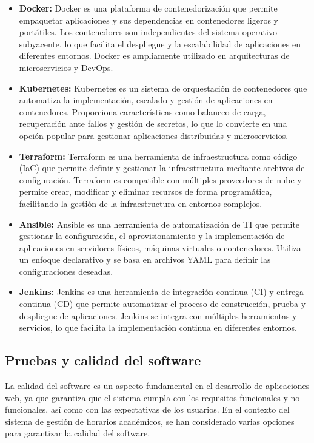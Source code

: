 \begin{itemize}
    \item \textbf{Docker:} Docker es una plataforma de contenedorización que permite empaquetar aplicaciones y sus dependencias en contenedores ligeros y portátiles. Los contenedores son independientes del sistema operativo subyacente, lo que facilita el despliegue y la escalabilidad de aplicaciones en diferentes entornos. Docker es ampliamente utilizado en arquitecturas de microservicios y DevOps.
    \item \textbf{Kubernetes:} Kubernetes es un sistema de orquestación de contenedores que automatiza la implementación, escalado y gestión de aplicaciones en contenedores. Proporciona características como balanceo de carga, recuperación ante fallos y gestión de secretos, lo que lo convierte en una opción popular para gestionar aplicaciones distribuidas y microservicios.
    \item \textbf{Terraform:} Terraform es una herramienta de infraestructura como código (IaC) que permite definir y gestionar la infraestructura mediante archivos de configuración. Terraform es compatible con múltiples proveedores de nube y permite crear, modificar y eliminar recursos de forma programática, facilitando la gestión de la infraestructura en entornos complejos.
    \item \textbf{Ansible:} Ansible es una herramienta de automatización de TI que permite gestionar la configuración, el aprovisionamiento y la implementación de aplicaciones en servidores físicos, máquinas virtuales o contenedores. Utiliza un enfoque declarativo y se basa en archivos YAML para definir las configuraciones deseadas.
    \item \textbf{Jenkins:} Jenkins es una herramienta de integración continua (CI) y entrega continua (CD) que permite automatizar el proceso de construcción, prueba y despliegue de aplicaciones. Jenkins se integra con múltiples herramientas y servicios, lo que facilita la implementación continua en diferentes entornos.
\end{itemize}

\subsection{Pruebas y calidad del software}

La calidad del software es un aspecto fundamental en el desarrollo de aplicaciones web, ya que garantiza que el sistema cumpla con los requisitos funcionales y no funcionales, así como con las expectativas de los usuarios. En el contexto del sistema de gestión de horarios académicos, se han considerado varias opciones para garantizar la calidad del software.

